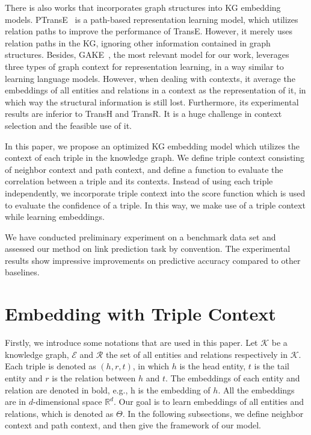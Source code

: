 There is also works that incorporates graph structures into KG embedding models. PTransE~\cite{LinLLSRL15} is a path-based representation learning model, which utilizes relation paths to improve the performance of TransE. However, it merely uses relation paths in the KG, ignoring other information contained in graph structures. Besides, GAKE~\cite{FengHYZ16}, the most relevant model for our work, leverages three types of graph context for representation learning, in a way similar to learning language models. However, when dealing with contexts, it average the embeddings of all entities and relations in a context as the representation of it, in which way the structural information is still lost. Furthermore, its experimental results are inferior to TransH and TransR. It is a huge challenge in context selection and the feasible use of it.

In this paper, we propose an optimized KG embedding model which utilizes the context of each triple in the knowledge graph. We define triple context consisting of neighbor context and path context, and define a function to evaluate the correlation between a triple and its contexts. Instead of using each triple independently, we incorporate triple context into the score function which is used to evaluate the confidence of a triple. In this way, we make use of a triple context while learning embeddings.

We have conducted preliminary experiment on a benchmark data set and assessed our method on link prediction task by convention. The experimental results show impressive improvements on predictive accuracy compared to other baselines.




\section{Embedding with Triple Context}
Firstly, we introduce some notations that are used in this paper. Let $\mathcal{K}$ be a knowledge graph, $\mathcal{E}$ and $\mathcal{R}$ the set of all entities and relations respectively in $\mathcal{K}$. Each triple is denoted as $(h, r, t)$, in which $h$ is the head entity, $t$ is the tail entity and $r$ is the relation between $h$ and $t$. The embeddings of each entity and relation are denoted in bold, e.g., $\bm{\mathrm{h}}$ is the embedding of $h$. All the embeddings are in $d$-dimensional space $\mathbb{R}^d$. Our goal is to learn embeddings of all entities and relations, which is denoted as $\Theta$. In the following subsections, we define neighbor context and path context, and then give the framework of our model.

